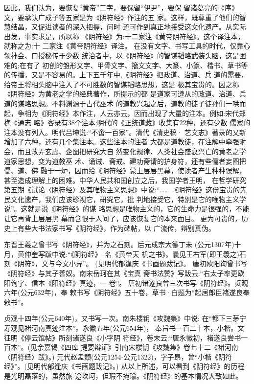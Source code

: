 \documentclass[12pt,UTF8]{ctexbook}
\begin{document}
因此，我们认为，要恢复“黄帝”二字，要保留“伊尹”，要保
留诸葛亮的《序》文，要承认广成子等五家是为《阴符经》作注的五
家。这样，既尊重了他们的智慧结晶，又促进读者的深入把握，问时
还可作到真正地接受这文化遗产。从实际出发，事实求是，所以称
《阴符经》为:十二家注《黄帝阴符经》。这个译注本，就称之为:十
二家注《黄帝阴符经》译注。
在没有文字、书写工具的时代，仅靠心领神会、口授秘传于少数
统治者中，以《阴符经》的智谋韬略武装头脑，这是困难的;在有了
初创的雏形文字、甲骨文字、籀文文字、大篆、小篆、楷书、草书等
的传播，又是不容易的。上下五千年中,《阴符经》把政道、治道、兵
道的需要，给帝王将相头脑中注入了不可胜数的智谋韬略思想，这是
极其宝贵的。因之称《阴符经》为黄老之学的经典著作，所提示的都
是道家可遵从的政道、治道、兵道的谋略思想。不料渊源于古代巫术
的道教兴起之后，道教的徒子徒孙们一哄而起，争相为《阴符经》本作注，人云亦云，因而出现了大量的注本。例如:宋代郑樵《通志
略》客录有38个注本;明代的《正统道藏》收集有22种，还有少数
儒家的注本没有列入。明代吕坤说:“不啻一百家”。清代《清史稿·
艺文志》著录的乂新增加了六种，还有几个集注本。这些注本的注者
大都是道教徒，在注解中牵强附会，而且故弄玄虚、企图把研究大自
然变化规律、人类社会盛衰兴亡的黄老之学道家思想，变为道教巫
术、诵诫、斋戒、建功斋请的护身符，还有些儒者妄图把儒、道、佛
融于一炉，因而给《阴符经》蒙上层层黑幕，使读者产生种种误解，
甚至造成理解上的困难。中华人民共和国创立之后，我国学者王明，
在哲学研究第五期《试论〈阴符经〉及其唯物主义思想》中说:“……
《阴符经》这份宝贵的先民文化遗产，我们应该珍视它，研究它，批
判地接受它，特别是它的唯物主义学说”。这就是说《阴符经》的谋
略思想是唯物主义的，它的生命力是很强的，不能让它再背上层层黑
幕而含恨于人间了，应该恢复它的本来面目。
更为可贵的，历史上有些大书法家书写《阴符经》，作为碑帖，以
广流传，辩别真伪。

东晋王羲之曾书写《阴符经》，并为之石刻。后元成宗大德丁未
(公元1307年)十月，黄仲奎写跋中说:“《阴符经》--名《黄帝天
机之书》。曩见王右军(即王羲之)石刻《阴符》，文与今文小异”。
(见明代郁逢庆《书画题跋记》。
唐初欧阳询曾书写《阴符经》与其子善奴。南宋岳珂在其《宝真
斋书法赞》写跋云:“右太子率更欧阳询字、信本《阳符经》真迹，一
卷”。
唐初诸遂良曾三次书写《阴符经》。贞观六年(公元632年)，奉
敕书写《阴符经》五十卷，草书·白题为“起居郎臣褚遂良奉敕书”。

贞观十四年(公元640年)，又书写一次。南朱楼钥《攻魏集》中说:
在“都下三茅宁寿观见褚河南真迹注本”。永徽五年(公元654年)，
奉旨书一百二十本，小楷。文征明《停云馆帖》所刻诸遂良《小字阴
符经》，卷末云:“唐永徽初，褚遂良尝书一百本”。(见余嘉锡《四库
提要辩证》引南宋楼钥《攻魏集》卷七十二《褚河南〈阴符经〉跋》。)
元代赵孟颓(公元1254-公元1322)，字子昂，曾“小楷《阴符
经》”。(见明代郁逢庆《书画题跋记》。)
从以上所述，可以看到《阴符经》的历程是光明磊落的，虽然旅
途坎坷，但瑕不掩瑜。《阴符经》的基本情况大致如此。
\end{document}
